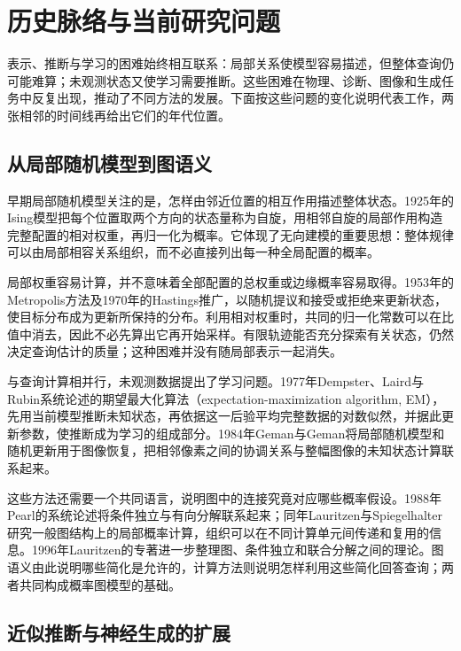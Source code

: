 \section{历史脉络与当前研究问题}
\label{sec:pgm-overview-history}

表示、推断与学习的困难始终相互联系：局部关系使模型容易描述，但整体查询仍可能难算；未观测状态又使学习需要推断。这些困难在物理、诊断、图像和生成任务中反复出现，推动了不同方法的发展。下面按这些问题的变化说明代表工作，两张相邻的时间线再给出它们的年代位置。

\subsection{从局部随机模型到图语义}

早期局部随机模型关注的是，怎样由邻近位置的相互作用描述整体状态。1925年的Ising模型把每个位置取两个方向的状态量称为自旋，用相邻自旋的局部作用构造完整配置的相对权重，再归一化为概率。它体现了无向建模的重要思想：整体规律可以由局部相容关系组织，而不必直接列出每一种全局配置的概率。

局部权重容易计算，并不意味着全部配置的总权重或边缘概率容易取得。1953年的Metropolis方法及1970年的Hastings推广，以随机提议和接受或拒绝来更新状态，使目标分布成为更新所保持的分布。利用相对权重时，共同的归一化常数可以在比值中消去，因此不必先算出它再开始采样。有限轨迹能否充分探索有关状态，仍然决定查询估计的质量；这种困难并没有随局部表示一起消失。

与查询计算相并行，未观测数据提出了学习问题。1977年Dempster、Laird与Rubin系统论述的期望最大化算法（expectation-maximization algorithm, EM），先用当前模型推断未知状态，再依据这一后验平均完整数据的对数似然，并据此更新参数，使推断成为学习的组成部分。1984年Geman与Geman将局部随机模型和随机更新用于图像恢复，把相邻像素之间的协调关系与整幅图像的未知状态计算联系起来。

这些方法还需要一个共同语言，说明图中的连接究竟对应哪些概率假设。1988年Pearl的系统论述将条件独立与有向分解联系起来；同年Lauritzen与Spiegelhalter研究一般图结构上的局部概率计算，组织可以在不同计算单元间传递和复用的信息。1996年Lauritzen的专著进一步整理图、条件独立和联合分解之间的理论。图语义由此说明哪些简化是允许的，计算方法则说明怎样利用这些简化回答查询；两者共同构成概率图模型的基础。

\subsection{近似推断与神经生成的扩展}

